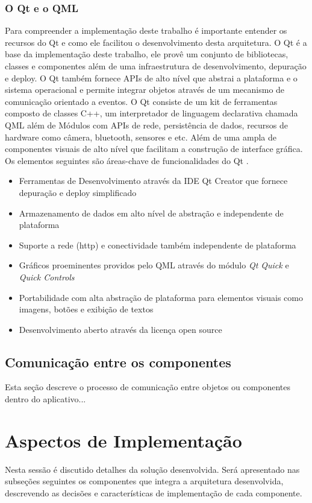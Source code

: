 \subsubsection{O Qt e o QML}\label{sec:solucao-desenvolvida}
Para compreender a implementação deste trabalho é importante entender os recursos do Qt e como ele facilitou o desenvolvimento desta arquitetura. O Qt é a base da implementação deste trabalho, ele provê um conjunto de bibliotecas, classes e componentes além de uma infraestrutura de desenvolvimento, depuração e deploy. O Qt também fornece APIs de alto nível que abstrai a plataforma e o sistema operacional e permite integrar objetos através de um mecanismo de comunicação orientado a eventos. O Qt consiste de um kit de ferramentas composto de classes C++, um interpretador de linguagem declarativa chamada QML além de Módulos com APIs de rede, persistência de dados, recursos de hardware como câmera, bluetooth, sensores e etc. Além de uma ampla de componentes visuais de alto nível que facilitam a construção de interface gráfica. Os elementos seguintes são áreas-chave de funcionalidades do Qt \cite{qt_overviews}.

\begin{itemize}
	\item Ferramentas de Desenvolvimento através da IDE Qt Creator que fornece depuração e deploy simplificado
	\item Armazenamento de dados em alto nível de abstração e independente de plataforma
	\item Suporte a rede (http) e conectividade também independente de plataforma
	\item Gráficos proeminentes providos pelo QML através do módulo \textit{Qt Quick} e \textit{Quick Controls}
	\item Portabilidade com alta abstração de plataforma para elementos visuais como imagens, botões e exibição de textos
	\item Desenvolvimento aberto através da licença open source
\end{itemize}

\subsection{Comunicação entre os componentes}
Esta seção descreve o processo de comunicação entre objetos ou componentes dentro do aplicativo...


\section{Aspectos de Implementação}\label{sec:solucao-desenvolvida}
Nesta sessão é discutido detalhes da solução desenvolvida. Será apresentado nas subseções seguintes os componentes que integra a arquitetura desenvolvida, descrevendo as decisões e características de implementação de cada componente.


